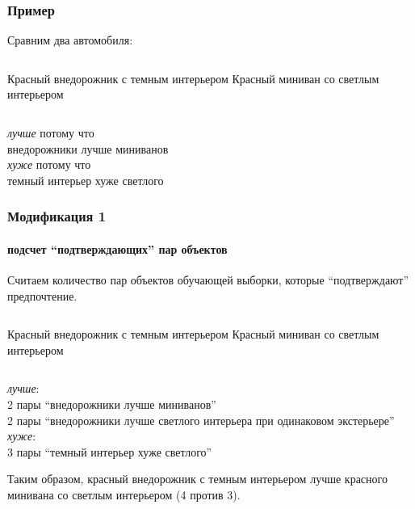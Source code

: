 \documentclass[xcolor=table,handout]{beamer}
\theoremstyle{definition}
\begin{document}
	\begin{frame}
		\frametitle{Пример}
		\begin{center}
			Сравним два автомобиля:
		\end{center}
		\begin{columns}[c] 
			Красный внедорожник с темным интерьером
	    	Красный миниван со светлым интерьером
		\end{columns}
		\begin{center}
			\vspace{2em}
			\emph{лучше} потому что \\внедорожники лучше миниванов \\
			\vspace{2em}
			\emph{хуже} потому что \\темный интерьер хуже светлого 
		\end{center}
	\end{frame}
	
	\begin{frame}
		\frametitle{Модификация 1}
		\framesubtitle{подсчет ``подтверждающих'' пар объектов}
		Считаем количество пар объектов обучающей выборки, которые ``подтверждают'' предпочтение. 
		\vspace{1.4em}
		\begin{columns}[c] 
			\column{.5\textwidth} 
			Красный внедорожник с темным интерьером
			\column{.5\textwidth}
			Красный миниван со светлым интерьером
		\end{columns}
		\begin{center}
			\vspace{0.5em}
			\emph{лучше}: \\ 
			2 пары ``внедорожники лучше миниванов'' \\
			2 пары ``внедорожники лучше светлого интерьера при одинаковом экстерьере'' \\
			\vspace{1em}
			\emph{хуже}: \\
			3 пары ``темный интерьер хуже светлого''
		\end{center}
		
		\vspace{1.5em}
		Таким образом, красный внедорожник с темным интерьером {\color{green} лучше} красного минивана со светлым интерьером (4 против 3).
	\end{frame}
	
\end{document}
